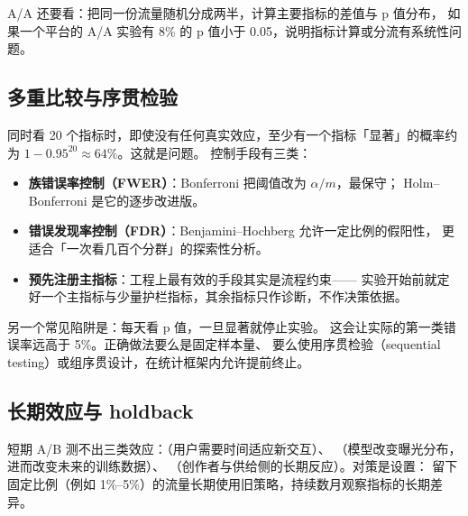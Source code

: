 A/A 还要看：把同一份流量随机分成两半，计算主要指标的差值与 p 值分布，
如果一个平台的 A/A 实验有 8\% 的 p 值小于 0.05，说明指标计算或分流有系统性问题。

\subsection{多重比较与序贯检验}

同时看 20 个指标时，即使没有任何真实效应，至少有一个指标「显著」的概率约为
$1 - 0.95^{20} \approx 64\%$。这就是问题。
控制手段有三类：

\begin{itemize}
  \item \textbf{族错误率控制（FWER）}：Bonferroni 把阈值改为 $\alpha / m$，最保守；
        Holm--Bonferroni 是它的逐步改进版。
  \item \textbf{错误发现率控制（FDR）}：Benjamini--Hochberg 允许一定比例的假阳性，
        更适合「一次看几百个分群」的探索性分析。
  \item \textbf{预先注册主指标}：工程上最有效的手段其实是流程约束——
        实验开始前就定好一个主指标与少量护栏指标，其余指标只作诊断，不作决策依据。
\end{itemize}

另一个常见陷阱是：每天看 p 值，一旦显著就停止实验。
这会让实际的第一类错误率远高于 5\%。正确做法要么是固定样本量、
要么使用序贯检验（sequential testing）或组序贯设计，在统计框架内允许提前终止。

\subsection{长期效应与 holdback}

短期 A/B 测不出三类效应：（用户需要时间适应新交互）、
（模型改变曝光分布，进而改变未来的训练数据）、
（创作者与供给侧的长期反应）。对策是设置：
留下固定比例（例如 1\%--5\%）的流量长期使用旧策略，持续数月观察指标的长期差异。

